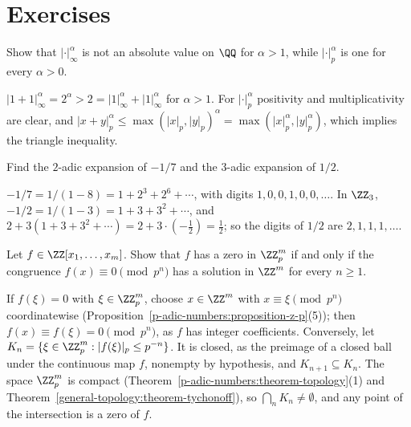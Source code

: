 \section{Exercises}\label{p-adic-numbers:section-exercises}

\begin{exercise}\label{p-adic-numbers:exercise-power-absolute-value}
Show that $|\cdot|_\infty^\alpha$ is not an absolute value on $\QQ$ for $\alpha > 1$, while $|\cdot|_p^\alpha$ is one for every $\alpha > 0$.
\end{exercise}

\begin{solution}
$|1 + 1|_\infty^\alpha = 2^\alpha > 2 = |1|_\infty^\alpha + |1|_\infty^\alpha$ for $\alpha > 1$. For $|\cdot|_p^\alpha$ positivity and multiplicativity are clear, and
$|x + y|_p^\alpha \leq \max(|x|_p, |y|_p)^\alpha = \max(|x|_p^\alpha, |y|_p^\alpha)$, which implies the triangle inequality.
\end{solution}

\begin{exercise}\label{p-adic-numbers:exercise-expansions}
Find the $2$-adic expansion of $-1/7$ and the $3$-adic expansion of $1/2$.
\end{exercise}

\begin{solution}
$-1/7 = 1/(1 - 8) = 1 + 2^3 + 2^6 + \cdots$, with digits $1, 0, 0, 1, 0, 0, \ldots$. In $\ZZ_3$, $-1/2 = 1/(1 - 3) = 1 + 3 + 3^2 + \cdots$, and
$2 + 3(1 + 3 + 3^2 + \cdots) = 2 + 3 \cdot(-\tfrac12) = \tfrac12$; so the digits of $1/2$ are $2, 1, 1, 1, \ldots$.
\end{solution}

\begin{exercise}\label{p-adic-numbers:exercise-solutions-mod-p-n}
Let $f \in \ZZ[x_1, \ldots, x_m]$. Show that $f$ has a zero in $\ZZ_p^m$ if and only if the congruence $f(x) \equiv 0 \pmod{p^n}$ has a solution in $\ZZ^m$ for every $n \geq 1$.
\end{exercise}

\begin{solution}
If $f(\xi) = 0$ with $\xi \in \ZZ_p^m$, choose $x \in \ZZ^m$ with $x \equiv \xi \pmod{p^n}$ coordinatewise (Proposition~\ref{p-adic-numbers:proposition-z-p}(5)); then $f(x) \equiv f(\xi) = 0 \pmod{p^n}$, as $f$ has integer
coefficients. Conversely, let $K_n = \{\xi \in \ZZ_p^m : |f(\xi)|_p \leq p^{-n}\}$. It is closed, as the preimage of a closed ball under the continuous map $f$, nonempty by hypothesis, and $K_{n+1} \subseteq K_n$.
The space $\ZZ_p^m$ is compact (Theorem~\ref{p-adic-numbers:theorem-topology}(1) and Theorem~\ref{general-topology:theorem-tychonoff}), so $\bigcap_nK_n \neq \emptyset$, and any point of the intersection is a zero of $f$.
\end{solution}

